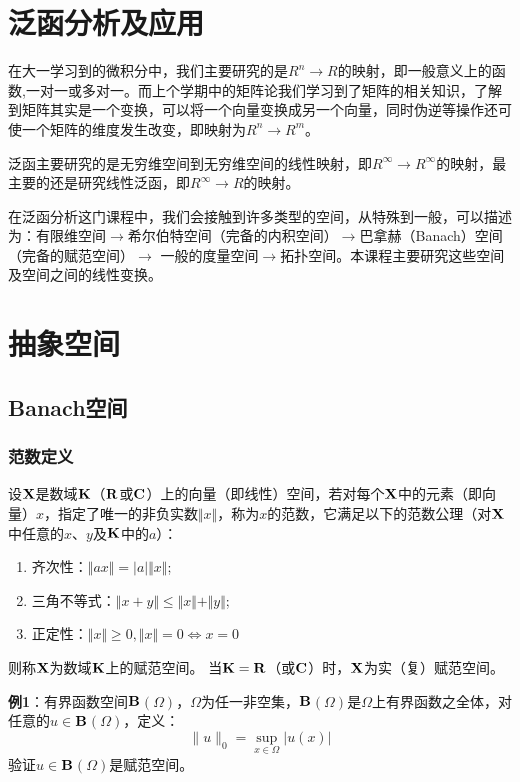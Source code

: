 \documentclass[12pt,a4paper]{article}
\begin{document}
\section{泛函分析及应用}
	在大一学习到的微积分中，我们主要研究的是$R^n\rightarrow R$的映射，即一般意义上的函数,一对一或多对一。而上个学期中的矩阵论我们学习到了矩阵的相关知识，了解到矩阵其实是一个变换，可以将一个向量变换成另一个向量，同时伪逆等操作还可使一个矩阵的维度发生改变，即映射为$R^n\rightarrow R^m$。
	
	泛函主要研究的是无穷维空间到无穷维空间的线性映射，即$R^{\infty}\rightarrow R^{\infty}$的映射，最主要的还是研究线性泛函，即$R^{\infty}\rightarrow R$的映射。
	
	在泛函分析这门课程中，我们会接触到许多类型的空间，从特殊到一般，可以描述为：有限维空间$\rightarrow$希尔伯特空间（完备的内积空间）$\rightarrow$巴拿赫（Banach）空间（完备的赋范空间）$\rightarrow$ 一般的度量空间$\rightarrow$拓扑空间。本课程主要研究这些空间及空间之间的线性变换。
\section{抽象空间}
\subsection{Banach空间}
\subsubsection{范数定义}
设$\bf{X}$是数域$\bf{K}$（$\bf{R}$或$\bf{C}$）上的向量（即线性）空间，若对每个$\bf{X}$中的元素（即向量）$x$，指定了唯一的非负实数$\Vert x \Vert$，称为$x$的范数，它满足以下的范数公理（对$\bf{X}$中任意的$x$、$y$及$\bf{K}$中的$a$）：
\begin{enumerate}
	\item 齐次性：$\Vert a x\Vert = \vert a\vert \Vert x\Vert$;
	\item 三角不等式：$\Vert x+y \Vert \leq \Vert x \Vert + \Vert y \Vert$;
	\item 正定性：$\Vert x \Vert\geq 0,\Vert x \Vert=0 \Leftrightarrow x=0$
\end{enumerate}
则称$\bf{X}$为数域$\bf{K}$上的赋范空间。
当$\bf{K}=\bf{R}$（或$\bf{C}$）时，$\bf{X}$为实（复）赋范空间。

\textbf{例1}：有界函数空间$\bf{B}$$(\Omega)$，$\Omega$为任一非空集，$\bf{B}$$(\Omega)$是$\Omega$上有界函数之全体，对任意的$u\in$$\bf{B}$$(\Omega)$，定义：
\begin{equation}
	\|u\|_{0}=\sup _{x \in \Omega}|u(x)|
\end{equation}
验证$u\in$$\bf{B}$$(\Omega)$是赋范空间。
\end{document}
